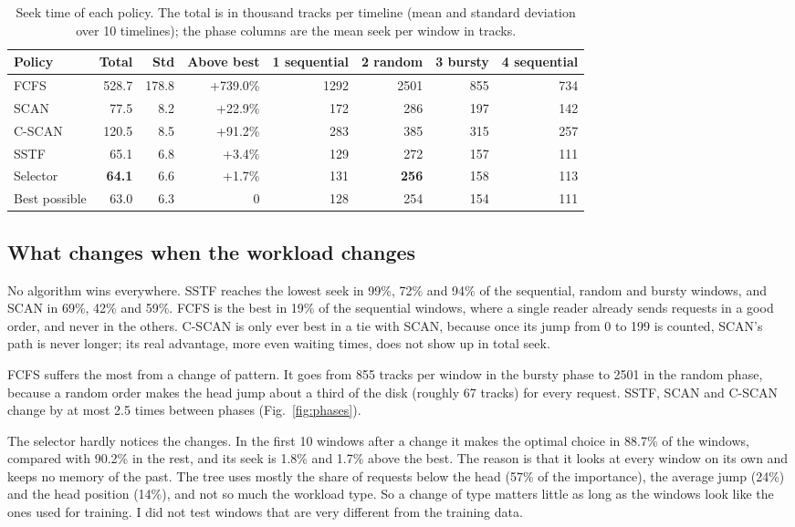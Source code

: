 \documentclass[conference]{IEEEtran}
\begin{document}
\begin{table}[t]
\caption{Seek time of each policy. The total is in thousand tracks per timeline (mean and standard deviation over 10 timelines); the phase columns are the mean seek per window in tracks.}
\label{tab:seek}
\centering\small
\begin{tabular}{@{}lrrrrrrr@{}}
\toprule
Policy & Total & Std & Above best & 1 sequential & 2 random & 3 bursty & 4 sequential \\
\midrule
FCFS & 528.7 & 178.8 & +739.0\% & 1292 & 2501 & 855 & 734 \\
SCAN & 77.5 & 8.2 & +22.9\% & 172 & 286 & 197 & 142 \\
C-SCAN & 120.5 & 8.5 & +91.2\% & 283 & 385 & 315 & 257 \\
SSTF & 65.1 & 6.8 & +3.4\% & 129 & 272 & 157 & 111 \\
Selector & \textbf{64.1} & 6.6 & +1.7\% & 131 & \textbf{256} & 158 & 113 \\
Best possible & 63.0 & 6.3 & 0 & 128 & 254 & 154 & 111 \\
\bottomrule
\end{tabular}
\end{table}

\subsection{What changes when the workload changes}
No algorithm wins everywhere. SSTF reaches the lowest seek in 99\%, 72\% and 94\% of the sequential, random and bursty windows, and SCAN in 69\%, 42\% and 59\%. FCFS is the best in 19\% of the sequential windows, where a single reader already sends requests in a good order, and never in the others. C-SCAN is only ever best in a tie with SCAN, because once its jump from 0 to 199 is counted, SCAN's path is never longer; its real advantage, more even waiting times, does not show up in total seek.

FCFS suffers the most from a change of pattern. It goes from 855 tracks per window in the bursty phase to 2501 in the random phase, because a random order makes the head jump about a third of the disk (roughly 67 tracks) for every request. SSTF, SCAN and C-SCAN change by at most 2.5 times between phases (Fig.~\ref{fig:phases}).

The selector hardly notices the changes. In the first 10 windows after a change it makes the optimal choice in 88.7\% of the windows, compared with 90.2\% in the rest, and its seek is 1.8\% and 1.7\% above the best. The reason is that it looks at every window on its own and keeps no memory of the past. The tree uses mostly the share of requests below the head (57\% of the importance), the average jump (24\%) and the head position (14\%), and not so much the workload type. So a change of type matters little as long as the windows look like the ones used for training. I did not test windows that are very different from the training data.
\end{document}

